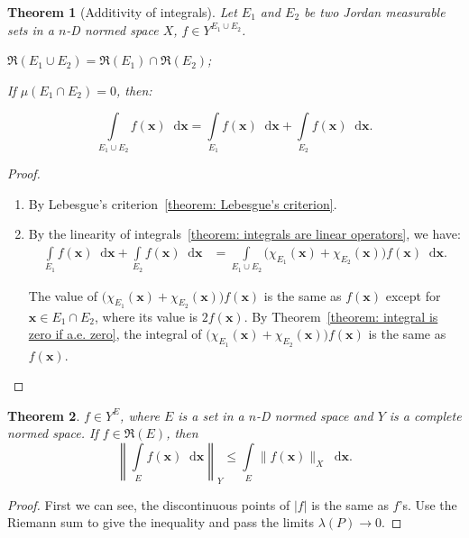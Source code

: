 \documentclass[openany]{book}
\theoremstyle{plain}
\newtheorem{theorem}{Theorem}[section] %
\theoremstyle{definition}
\newcommand{\dif}{\mathop{}\!\mathrm{d}} %
\newcommand*{\bv}{\boldsymbol} %
\begin{document}
\begin{theorem}[Additivity of integrals]
	Let $E_1$ and $E_2$ be two Jordan measurable sets in a $n$-D normed space $X$, $f \in Y^{E_1 \cup E_2}$.
	\begin{enumerate*}
		\item $\mathfrak R(E_1 \cup E_2) = \mathfrak R(E_1) \cap \mathfrak R(E_2)$;
		\item If $\mu(E_1 \cap E_2) = 0$, then:
	\end{enumerate*} 
	\begin{equation*}
		\int\limits_{E_1 \cup E_2} f(\bv x) \dif \bv x 
			= \int\limits_{E_1} f(\bv x) \dif \bv x
				+ \int\limits_{E_2} f(\bv x) \dif \bv x.
	\end{equation*}
\end{theorem}
\begin{proof}
	\begin{enumerate}
		\item By Lebesgue's criterion~\ref{theorem: Lebesgue's criterion}.
		\item By the linearity of integrals~\ref{theorem: integrals are linear operators}, we have:
		\begin{align*}
			\int\limits_{E_1} f(\bv x) \dif \bv x
				+ \int\limits_{E_2} f(\bv x) \dif \bv x 
				&= \int\limits_{E_1 \cup E_2} \big(
						\chi_{E_1}(\bv x)  + \chi_{E_2}(\bv x)
					\big) f(\bv x) \dif \bv x.
		\end{align*}

		The value of $\big(\chi_{E_1}(\bv x)  + \chi_{E_2}(\bv x)\big) f(\bv x)$ is the same as $f(\bv x)$ except for $\bv x \in E_1 \cap E_2$, where its value is $2f(\bv x)$. 
		By Theorem~\ref{theorem: integral is zero if a.e. zero}, the integral of $\big(\chi_{E_1}(\bv x)  + \chi_{E_2}(\bv x)\big) f(\bv x)$ is the same as $f(\bv x)$.
	\end{enumerate}
\end{proof}

\begin{theorem}\label{theorem: the int of abs and the abs of int}
	$f \in Y^E$, where $E$ is a set in a $n$-D normed space and $Y$ is a complete normed space. 
	If $f \in \mathfrak R(E)$, then
	\begin{equation*}
		\left\|
			\int\limits_E f(\bv x) \dif \bv x
		\right\|_Y \leq \int\limits_E \|f(\bv x)\|_X \dif \bv x.
	\end{equation*}
\end{theorem}
\begin{proof}
	First we can see, the discontinuous points of $|f|$ is the same as $f$'s.
	Use the Riemann sum to give the inequality and pass the limits $\lambda(P) \to 0$.
\end{proof}
\end{document}
